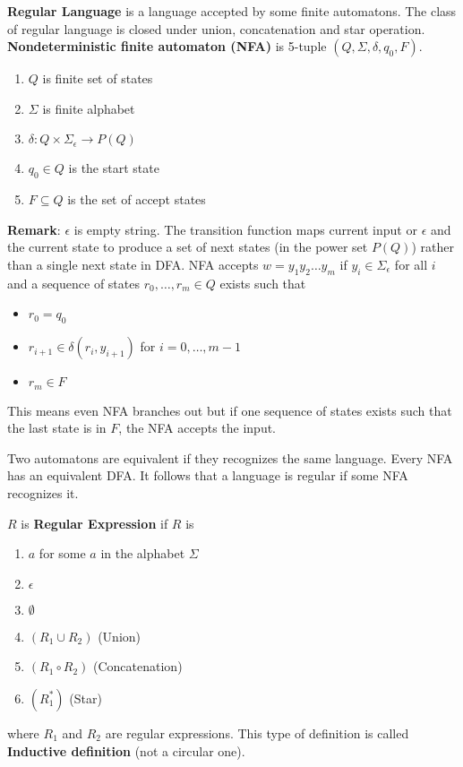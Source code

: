 \documentclass[12pt]{article}
\begin{document}
\textbf{Regular Language} is a language accepted by some finite automatons. The class of regular language is closed under union, concatenation and star operation. \\

\textbf{Nondeterministic finite automaton (NFA)} is 5-tuple $(Q,\Sigma,\delta,q_0, F)$.
\begin{enumerate}
	\item $Q$ is finite set of states
	\item $\Sigma$ is finite alphabet
	\item $\delta: Q\times \Sigma_\epsilon \longrightarrow P(Q)$
	\item $q_0\in Q$ is the start state
	\item $F \subseteq Q$ is the set of accept states
\end{enumerate}
\textbf{Remark}: $\epsilon$ is empty string. The transition function maps current input or $\epsilon$ and the current state to produce a set of next states (in the power set $P(Q)$) rather than a single next state in DFA. NFA accepts $w = y_1y_2\ldots y_m$ if $y_i \in \Sigma_\epsilon$ for all $i$ and a sequence of states $r_0, \ldots, r_m \in Q$ exists such that \begin{itemize}
	\item $r_0 = q_0$
	\item $r_{i+1} \in \delta (r_i, y_{i+1})$ for $i = 0, \ldots, m-1$
	\item $r_m \in F$
\end{itemize}
This means even NFA branches out but if one sequence of states exists such that the last state is in $F$, the NFA accepts the input.\\

\begin{theorem}
	Two automatons are equivalent if they recognizes the same language. Every NFA has an equivalent DFA. It follows that a language is regular if some NFA recognizes it.
\end{theorem}

$R$ is \textbf{Regular Expression} if $R$ is \begin{enumerate}
	\item $a$ for some $a$ in the alphabet $\Sigma$
	\item $\epsilon$
	\item $\emptyset$
	\item $(R_1 \cup R_2)$  (Union)
	\item $(R_1 \circ R_2)$ (Concatenation)
	\item $(R_1^*)$ (Star)
\end{enumerate}
where $R_1$ and $R_2$ are regular expressions. This type of definition is called \textbf{Inductive definition} (not a circular one).
\end{document}
